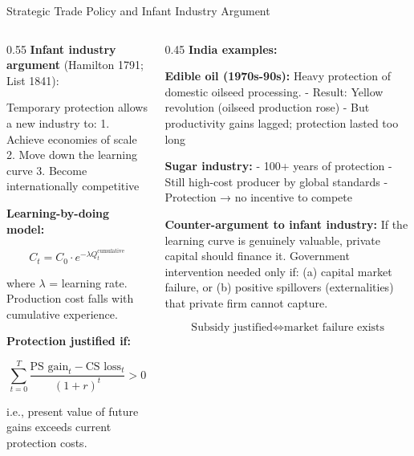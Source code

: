 \documentclass[
  ignorenonframetext,
  aspectratio=169,
]{beamer}
\makeatletter
\let\quarto@originallabel\label
\DeclareRobustCommand*{\label}[1]{\quarto@originallabel{#1}}
\makeatother
\begin{document}
\begin{frame}{Strategic Trade Policy and Infant Industry Argument}
\label{strategic-trade-policy-and-infant-industry-argument}
\begin{columns}[T]
\begin{column}{0.55\linewidth}
\textbf{Infant industry argument} (Hamilton 1791; List 1841):

Temporary protection allows a new industry to: 1. Achieve economies of
scale 2. Move down the learning curve 3. Become internationally
competitive

\textbf{Learning-by-doing model:}

\[C_t = C_0 \cdot e^{-\lambda Q_t^{\text{cumulative}}}\]

where \(\lambda\) = learning rate. Production cost falls with cumulative
experience.

\textbf{Protection justified if:}

\[\sum_{t=0}^{T} \frac{\text{PS gain}_t - \text{CS loss}_t}{(1+r)^t} > 0\]

i.e., present value of future gains exceeds current protection costs.
\end{column}

\begin{column}{0.45\linewidth}
\textbf{India examples:}

\textbf{Edible oil (1970s-90s):} Heavy protection of domestic oilseed
processing. - Result: Yellow revolution (oilseed production rose) - But
productivity gains lagged; protection lasted too long

\textbf{Sugar industry:} - 100+ years of protection - Still high-cost
producer by global standards - Protection → no incentive to compete

\textbf{Counter-argument to infant industry:} If the learning curve is
genuinely valuable, private capital should finance it. Government
intervention needed only if: (a) capital market failure, or (b) positive
spillovers (externalities) that private firm cannot capture.

\[\text{Subsidy justified} \iff \text{market failure exists}\]
\end{column}
\end{columns}
\end{frame}
\end{document}
